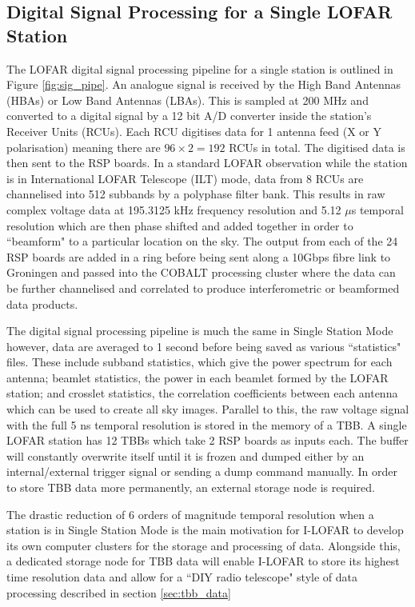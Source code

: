 \subsection{Digital Signal Processing for a Single LOFAR Station}
\label{sec:sig_pipe}
The LOFAR digital signal processing pipeline for a single station is outlined in Figure \ref{fig:sig_pipe}. An analogue signal is received by the High Band Antennas (HBAs) or Low Band Antennas (LBAs). This is sampled at 200 MHz and converted to a digital signal by a 12 bit A/D converter inside the station's Receiver Units (RCUs). Each RCU digitises data for 1 antenna feed (X or Y polarisation) meaning there are $96 \times 2 = 192$ RCUs in total. The digitised data is then sent to the RSP boards. In a standard LOFAR observation while the station is in International LOFAR Telescope (ILT) mode, data from 8 RCUs are channelised into 512 subbands by a polyphase filter bank. This results in raw complex voltage data at 195.3125 kHz frequency resolution and 5.12 $\mu$s temporal resolution which are then phase shifted and added together in order to ``beamform" to a particular location on the sky. The output from each of the 24 RSP boards are added in a ring before being sent along a 10Gbps fibre link to Groningen and passed into the COBALT processing cluster where the data can be further channelised and correlated to produce interferometric or beamformed data products.

The digital signal processing pipeline is much the same in Single Station Mode however, data are averaged to 1 second before being saved as various ``statistics" files. These include subband statistics, which give the power spectrum for each antenna; beamlet statistics, the power in each beamlet formed by the LOFAR station; and crosslet statistics, the correlation coefficients between each antenna which can be used to create all sky images.
Parallel to this, the raw voltage signal with the full 5 ns temporal resolution is stored in the memory of a TBB. A single LOFAR station has 12 TBBs which take 2 RSP boards as inputs each. The buffer will constantly overwrite itself until it is frozen and dumped either by an internal/external trigger signal or sending a dump command manually. In order to store TBB data more permanently, an external storage node is required.



The drastic reduction of 6 orders of magnitude temporal resolution when a station is in Single Station Mode is the main motivation for I-LOFAR to develop its own computer clusters for the storage and processing of data. Alongside this, a dedicated storage node for TBB data will enable I-LOFAR to store its highest time resolution data and allow for a ``DIY radio telescope" style of data processing described in section \ref{sec:tbb_data}

